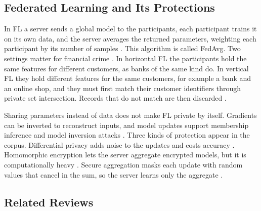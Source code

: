 \documentclass[journal]{IEEEtran}
\begin{document}
\subsection{Federated Learning and Its Protections}

In FL a server sends a global model to the participants, each participant trains it on its own data, and the server averages the returned parameters, weighting each participant by its number of samples \cite{mcmahan2017fedavg}. This algorithm is called FedAvg. Two settings matter for financial crime \cite{li2026plc}. In horizontal FL the participants hold the same features for different customers, as banks of the same kind do. In vertical FL they hold different features for the same customers, for example a bank and an online shop, and they must first match their customer identifiers through private set intersection. Records that do not match are then discarded \cite{li2026plc}.

Sharing parameters instead of data does not make FL private by itself. Gradients can be inverted to reconstruct inputs, and model updates support membership inference and model inversion attacks \cite{li2026plc,sami2024tinysecagg}. Three kinds of protection appear in the corpus. Differential privacy adds noise to the updates and costs accuracy \cite{li2026plc}. Homomorphic encryption lets the server aggregate encrypted models, but it is computationally heavy \cite{xiong2025hppbefl}. Secure aggregation masks each update with random values that cancel in the sum, so the server learns only the aggregate \cite{bonawitz2017secagg,sami2024tinysecagg}.

\subsection{Related Reviews}
\end{document}

